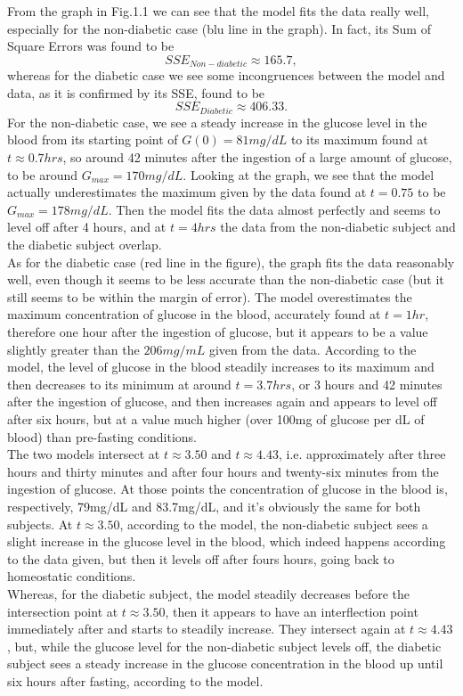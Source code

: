 From the graph in Fig.1.1 we can see that the model fits the data really well, especially for the non-diabetic case (blu line in the graph). In fact, its Sum of Square Errors was found to be
$$
SSE_{Non-diabetic} \approx 165.7,
$$ 
whereas for the diabetic case we see some incongruences between the model and data, as it is confirmed by its SSE, found to be
$$
SSE_{Diabetic} \approx 406.33.
$$
For the non-diabetic case, we see a steady increase in the glucose level in the blood from its starting point of $G(0) = 81 mg/dL$ to its maximum found at $t \approx 0.7hrs$, so around 42 minutes after the ingestion of a large amount of glucose, to be around $G_{max}=170mg/dL$. Looking at the graph, we see that the model actually underestimates the maximum given by the data found at $t=0.75$ to be $G_{max}=178mg/dL$. Then the model fits the data almost perfectly and seems to level off after 4 hours, and at $t=4hrs$ the data from the non-diabetic subject and the diabetic subject overlap.\\
As for the diabetic case (red line in the figure), the graph fits the data reasonably well, even though it seems to be less accurate than the non-diabetic case (but it still seems to be within the margin of error). The model overestimates the maximum concentration of glucose in the blood, accurately found at $t=1hr$, therefore one hour after the ingestion of glucose, but it appears to be a value slightly greater than the $206mg/mL$ given from the data. According to the model, the level of glucose in the blood steadily increases to its maximum and then decreases to its minimum at around $t=3.7hrs$, or 3 hours and 42 minutes after the ingestion of glucose, and then increases again and appears to level off after six hours, but at a value much higher (over 100mg of glucose per dL of blood) than pre-fasting conditions.\\
The two models intersect at $t \approx 3.50$ and $t \approx 4.43$, i.e. approximately after three hours and thirty minutes and after four hours and twenty-six minutes from the ingestion of glucose. At those points the concentration of glucose in the blood is, respectively, 79mg/dL and 83.7mg/dL, and it's obviously the same for both subjects. At $t \approx 3.50$, according to the model, the non-diabetic subject sees a slight increase in the glucose level in the blood, which indeed happens according to the data given, but then it levels off after fours hours, going back to homeostatic conditions.\\
Whereas, for the diabetic subject, the model steadily decreases before the intersection point at $t \approx 3.50$, then it appears to have an interflection point immediately after and starts to steadily increase. They intersect again at $t \approx 4.43$, but, while the glucose level for the non-diabetic subject levels off, the diabetic subject sees a steady increase in the glucose concentration in the blood up until six hours after fasting, according to the model.
